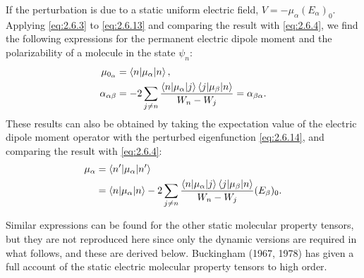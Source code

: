 \documentclass[%
class = book,%
crop = false,%
float = true,%
multi = true,%
preview = false,%
]{standalone}
\begin{document}
If the perturbation is due to a static uniform electric field, \(V = -\mu_{\alpha}(E_{\alpha})_{0}\). Applying \eqref{eq:2.6.3} to \eqref{eq:2.6.13} and comparing the result with \eqref{eq:2.6.4}, we find the following expressions for the permanent electric dipole moment and the polarizability of a molecule in the state \(\psi_{n}\):
\begin{align}
  \mu_{0_{\alpha}} &= \braket{n|\mu_{\alpha}|n}, \\
  \alpha_{\alpha\beta} &= -2 \sum_{j \neq n} \frac{\braket{n|\mu_{\alpha}|j}\braket{j|\mu_{\beta}|n}}{W_{n} - W_{j}} = \alpha_{\beta\alpha}.
\end{align}
These results can also be obtained by taking the expectation value of the electric dipole moment operator with the perturbed eigenfunction \eqref{eq:2.6.14}, and comparing the result with \eqref{eq:2.6.4}:
\begin{align}
  \mu_{\alpha} &= \braket{n'|\mu_{\alpha}|n'} \\
               &= \braket{n|\mu_{\alpha}|n} -2 \sum_{j \neq n} \frac{\braket{n|\mu_{\alpha}|j}\braket{j|\mu_{\beta}|n}}{W_{n} - W_{j}} (E_{\beta})_{0}.
\end{align}

Similar expressions can be found for the other static molecular property tensors, but they are not reproduced here since only the dynamic versions are required in what follows, and these are derived below. Buckingham (1967, 1978) has given a full account of the static electric molecular property tensors to high order.

\onlyifstandalone{\printbibliography}
\end{document}
